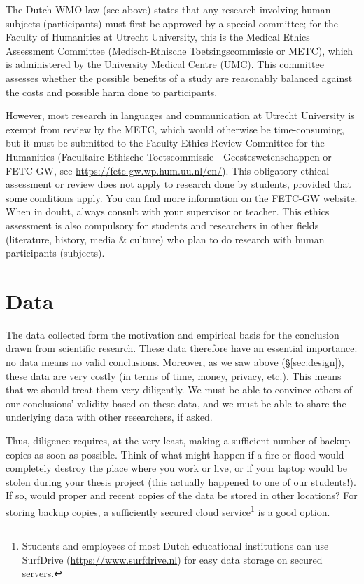 \documentclass[
]{book}
\begin{document}
The Dutch WMO law (see above) states that any research involving human subjects (participants) must first be approved by a special committee; for the Faculty of Humanities at Utrecht University, this is the Medical Ethics Assessment Committee (Medisch-Ethische Toetsingscommissie or METC), which is administered by the University Medical Centre (UMC). This committee assesses whether the possible benefits of a study are reasonably balanced against the costs and possible harm done to participants.

However, most research in languages and communication at Utrecht University is exempt from review by the METC, which would otherwise be time-consuming, but it must be submitted to the Faculty Ethics Review Committee for the Humanities (Facultaire Ethische Toetscommissie - Geesteswetenschappen or FETC-GW, see \url{https://fetc-gw.wp.hum.uu.nl/en/}).
This obligatory ethical assessment or review does not apply to research done by students, provided that some conditions apply.
You can find more information on the FETC-GW website. When in doubt, always consult with your supervisor or teacher.
This ethics assessment is also compulsory for students and researchers in other fields (literature, history, media \& culture) who plan to do research with human participants (subjects).

\section{Data}\label{data}

The data collected form the motivation and empirical basis for the conclusion drawn from scientific research. These data therefore have an essential importance: no data means no valid conclusions. Moreover, as we saw above (§\ref{sec:design}), these data are very costly (in terms of time, money, privacy, etc.). This means that we should treat them very diligently. We must be able to convince others of our conclusions' validity based on these data, and we must be able to share the underlying data with other researchers, if asked.

Thus, diligence requires, at the very least, making a sufficient number of backup copies as soon as possible. Think of what might happen if a fire or flood would completely destroy the place where you work or live, or if your laptop would be stolen during your thesis project (this actually happened to one of our students!). If so, would proper and recent copies of the data be stored in other locations? For storing backup copies, a sufficiently secured cloud service\footnote{Students and employees of most Dutch educational institutions can use SurfDrive (\url{https://www.surfdrive.nl}) for easy data storage on secured servers.} is a good option.
\end{document}
